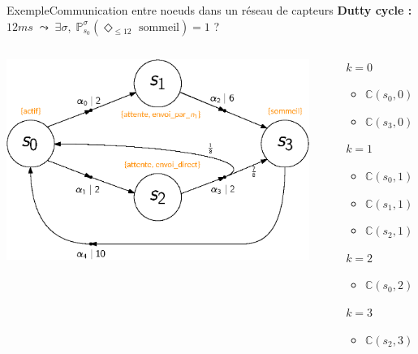 \documentclass[compress]{beamer}
\theoremstyle{theorem}%
\begin{document}
\begin{frame}{Exemple}{Communication entre noeuds dans un réseau de capteurs}
\textbf{Dutty cycle : }$12 ms \; \leadsto \; \exists \sigma, \; \mathbb{P}^\sigma_{s_0}(\Diamond_{\leq 12} \text{ sommeil}) = 1$ ?
\begin{columns}
  \begin{column}{0.5\linewidth}
    \includegraphics[width=\linewidth]{resources/main-mdp3}
  \end{column}
  \begin{column}{0.5\linewidth}
    \scriptsize
    \begin{itemize}
      \item[$k=0$] \begin{itemize}
        \item $\mathbb{C}(s_0, 0) = \mathbb{C}(s_1, 0) = \mathbb{C}(s_2, 0) = \infty$
        \item $\mathbb{C}(s_3, 0) = 0$
      \end{itemize}
      \item[$k=1$]
        \begin{itemize}
          \item $\mathbb{C}(s_0, 1) = \infty$
          \item $\mathbb{C}(s_1, 1) = 6 + 0 = 6$
          \item $\mathbb{C}(s_2, 1) = 2 + \infty = \infty$
        \end{itemize}
      \item[$k=2$]
        \begin{itemize}
          \item $\mathbb{C}(s_0, 2) = 2 + 6 = 8$
        \end{itemize}
      \item[$k=3$]
        \begin{itemize}
          \item $\mathbb{C}(s_2, 3) = 2 + 8 = 10$
        \end{itemize}
    \end{itemize}
  \end{column}
\end{columns}
\end{frame}
\end{document}

